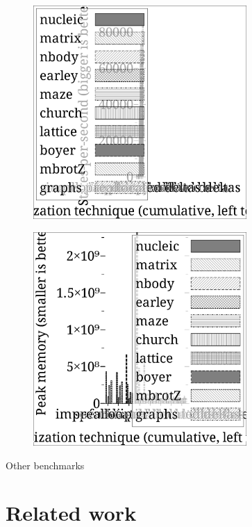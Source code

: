\documentclass[preprint,onecolumn,9pt]{sigplanconf} %
\begin{document}
\begin{figure}
\begin{center}
\includegraphics[width=3.2in]{state-per-sec.ps}
\end{center}
\end{figure}

\begin{figure}
\begin{center}
\includegraphics[width=3.2in]{peak-mem.ps}
\end{center}
\end{figure}





\cite{dvanhorn:Earl2012Introspective}

\cite{dvanhorn:wright-jagannathan-toplas98}

Other benchmarks

\section{Related work}
\label{sec:related}
\end{document}
